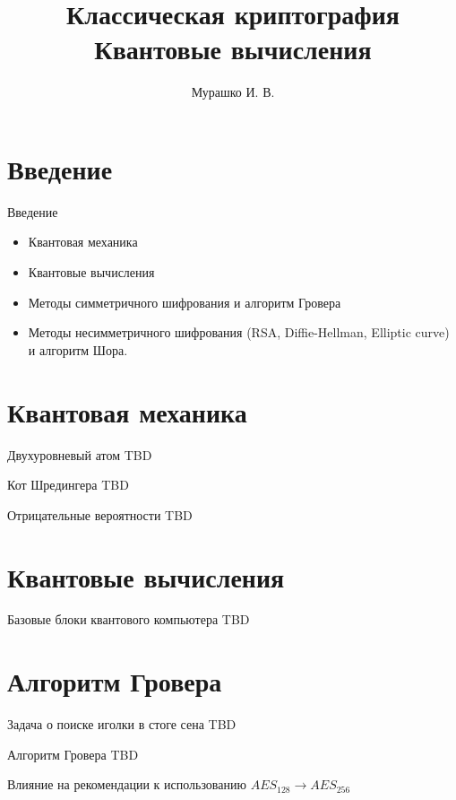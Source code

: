 \documentclass[10pt,pdf,hyperref={unicode}]{beamer}
\title[Криптография и квантовые вычисления]{Классическая
  криптография\\Квантовые вычисления}
\author{Мурашко И. В.}
\institute{Санкт Петербургский Государственный Политехнический Университет}
\date{}
\begin{document}
\section{Введение}

\begin{frame}{Введение}
\begin{itemize}
\item Квантовая механика
\item Квантовые вычисления
\item Методы симметричного шифрования и алгоритм Гровера
\item Методы несимметричного шифрования (RSA, Diffie-Hellman, Elliptic
curve) и алгоритм Шора.
\end{itemize}
\end{frame}

\section{Квантовая механика}
\begin{frame}{Двухуровневый атом}
TBD
\end{frame}

\begin{frame}{Кот Шредингера}
TBD
\end{frame}

\begin{frame}{Отрицательные вероятности}
TBD
\end{frame}

\section{Квантовые вычисления}
\begin{frame}{Базовые блоки квантового компьютера}
TBD
\end{frame}

\section{Алгоритм Гровера}
\begin{frame}{Задача о поиске иголки в стоге сена}
TBD
\end{frame}

\begin{frame}{Алгоритм Гровера}
TBD
\end{frame}

\begin{frame}{Влияние на рекомендации к использованию}
$AES_{128} \rightarrow AES_{256}$
\end{frame}
\end{document}
